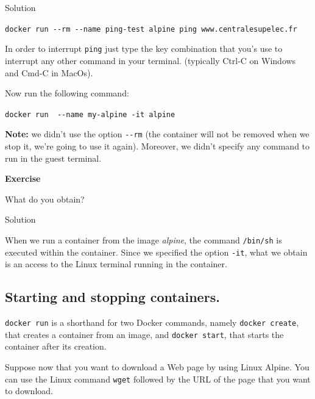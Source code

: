 \documentclass[
]{article}
\newenvironment{infobox}[1]
  {
  \begin{itemize}
  \renewcommand{\labelitemi}{
    \raisebox{-.7\height}[0pt][0pt]{
      
    }
  }
  \setlength{\fboxsep}{1em}
  \begin{whitebox}
  \item
  }
  {
  \end{whitebox}
  \end{itemize}
  }
\theoremstyle{definition}
\theoremstyle{definition}
\theoremstyle{definition}
\theoremstyle{remark}
\let\BeginKnitrBlock\begin \let\EndKnitrBlock\end
\begin{document}
Solution

\begin{infobox}{exercisebox}
\texttt{docker\ run\ -\/-rm\ -\/-name\ ping-test\ alpine\ ping\ www.centralesupelec.fr}

In order to interrupt \texttt{ping}
just type the key combination that you's use to
interrupt any other command in your terminal.
(typically Ctrl-C on Windows and Cmd-C in MacOs).

\end{infobox}

Now run the following command:

\texttt{docker\ run\ \ -\/-name\ my-alpine\ -it\ alpine}

\textbf{Note:} we didn't use the option \texttt{-\/-rm} (the container will not be removed
when we stop it, we're going to use it again).
Moreover, we didn't specify any command to run in the guest terminal.

\begin{infobox}{exercisebox}

\textbf{Exercise}

\BeginKnitrBlock{exercise}
\label{exr:unnamed-chunk-10}{\label{exr:unnamed-chunk-10} }What do you obtain?
\EndKnitrBlock{exercise}

\end{infobox}

Solution

\begin{infobox}{exercisebox}
When we run a container from the image \emph{alpine}, the command
\texttt{/bin/sh} is executed within the container.
Since we specified the option \texttt{-it}, what we obtain is an access to the
Linux terminal running in the container.

\end{infobox}

\subsection{Starting and stopping containers.}\label{starting-and-stopping-containers.}

\texttt{docker\ run} is a shorthand for two Docker commands, namely
\texttt{docker\ create}, that creates a container from an image,
and \texttt{docker\ start}, that starts the container after its creation.

Suppose now that you want to download a Web page
by using Linux Alpine.
You can use the Linux command \texttt{wget} followed by the URL of the page
that you want to download.
\end{document}
